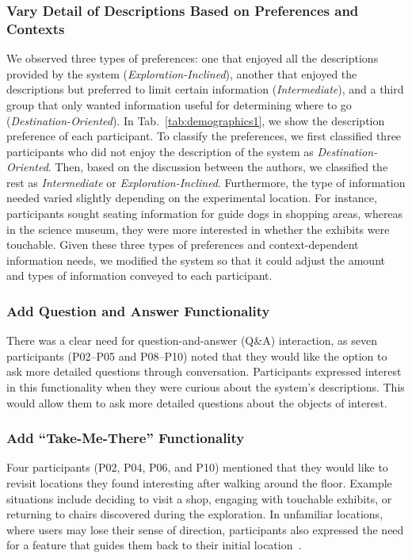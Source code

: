 \subsubsection{Vary Detail of Descriptions Based on Preferences and Contexts}
\label{sec:implication_varydetail}
We observed three types of preferences: one that enjoyed all the descriptions provided by the system (\textit{Exploration-Inclined}), another that enjoyed the descriptions but preferred to limit certain information (\textit{Intermediate}), and a third group that only wanted information useful for determining where to go (\textit{Destination-Oriented}). 
In Tab.~\ref{tab:demographics1}, we show the description preference of each participant.
To classify the preferences, we first classified three participants who did not enjoy the description of the system as \textit{Destination-Oriented}.
Then, based on the discussion between the authors, we classified the rest as \textit{Intermediate} or \textit{Exploration-Inclined}.
Furthermore, the type of information needed varied slightly depending on the experimental location. 
For instance, participants sought seating information for guide dogs in shopping areas, whereas in the science museum, they were more interested in whether the exhibits were touchable.
Given these three types of preferences and context-dependent information needs, we modified the system so that it could adjust the amount and types of information conveyed to each participant.

\subsubsection{Add Question and Answer Functionality}
\label{sec:implication_Q&A}
There was a clear need for question-and-answer (Q\&A) interaction, as seven participants (P02--P05 and P08--P10) noted that they would like the option to ask more detailed questions through conversation. 
Participants expressed interest in this functionality when they were curious about the system's descriptions. This would allow them to ask more detailed questions about the objects of interest.

\subsubsection{Add ``Take-Me-There'' Functionality} 
\label{sec:implication_takemethere}
Four participants (P02, P04, P06, and P10) mentioned that they would like to revisit locations they found interesting after walking around the floor. 
Example situations include deciding to visit a shop, engaging with touchable exhibits, or returning to chairs discovered during the exploration. 
In unfamiliar locations, where users may lose their sense of direction, participants also expressed the need for a feature that guides them back to their initial location~\cite{kuribayashi2023pathfinder}.

